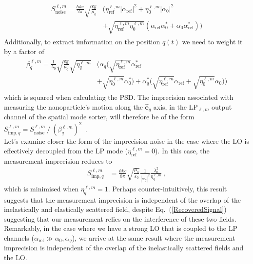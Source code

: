 \documentclass[%
 reprint,
 amsmath,amssymb,
 aps,
pra,
]{revtex4-2}
\begin{document}
\begin{align}\label{ShotNoisePSD}
\begin{split}
    S^{\ell, m}_{\mathrm{noise}} = \frac{\hbar k c}{2\pi}\sqrt{\frac{\varepsilon_{0}}{\mu_{0}}}&\Bigg(\eta^{\ell, m}_{\mathrm{ref}} |\alpha_{\mathrm{ref}}|^{2} + \eta^{\ell,m}_{0} |\alpha_{0}|^{2}  \\
    &+ \sqrt{\eta^{\ell,m}_{\mathrm{ref}}\eta^{\ell,m}_{0}}(\alpha_{\mathrm{ref}}\alpha_{0}^* + \alpha_{0}\alpha_{\mathrm{ref}}^*) \Bigg)
\end{split}
\end{align}
Additionally, to extract imformation on the position $q(t)$ we need to weight it by a factor of
\begin{align}\label{BetaDef}
\begin{split}
    \beta_{q}^{\ell,m} = \frac{1}{\lambda_{0}}\sqrt{\frac{\varepsilon_{0}}{\mu_{0}}}\sqrt{\eta^{\ell,m}_{q}}&\Bigg(\alpha_{q}\Big(\sqrt{\eta^{\ell,m}_{\mathrm{ref}}}\alpha_{\mathrm{ref}}^* \\
    &+ \sqrt{\eta^{\ell,m}_{0}}\alpha_{0}^*\Big) + \alpha_{q}^*\Big(\sqrt{\eta^{\ell,m}_{\mathrm{ref}}}\alpha_{\mathrm{ref}} + \sqrt{\eta^{\ell,m}_{0}}\alpha_{0}\Big) \Bigg)
\end{split}
\end{align}
which is squared when calculating the PSD. The imprecision associated with measuring the nanoparticle's motion along the $\boldsymbol{\hat{e}}_{q}$ axis, in the LP$_{\ell,m}$ output channel of the spatial mode sorter, will therefore be of the form ${S_{\mathrm{imp}, q}^{\ell,m} = S^{\ell,m}_{\mathrm{noise}} ~ / ~ (\beta_{q}^{\ell,m})^{2}}$~\cite{tebbenjohanns_optimal_2019, maurer_quantum_2023}. \\
Let's examine closer the form of the imprecision noise in the case where the LO is effectively decoupled from the LP mode ($\eta^{\ell,m}_{\mathrm{ref}} = 0$). In this case, the measurement imprecision reduces to
\vspace{1.5mm}
\begin{align}\label{MeasurementImprecisionForChip}
    S^{\ell, m}_{\mathrm{imp}, q} &= \frac{\hbar k c}{8\pi}\sqrt{\frac{\mu_{0}}{\varepsilon_{0}}} \frac{1}{|\alpha_{q}|^{2}}\frac{\lambda_{0}^{2}}{\eta^{\ell,m}_{q}} ~ ,
\end{align}
which is minimised when $\eta^{\ell,m}_{q} = 1$. Perhaps counter-intuitively, this result suggests that the measurement imprecision is independent of the overlap of the inelastically and elastically scattered field, despite Eq.~(\ref{RecoveredSignal}) suggesting that our measurement relies on the interference of these two fields. \\
Remarkably, in the case where we have a strong LO that is coupled to the LP channels ($\alpha_{\mathrm{ref}} \gg \alpha_{0}, \alpha_{q} $), we arrive at the same result where the measurement imprecision is independent of the overlap of the inelastically scattered fields and the LO.
\end{document}

